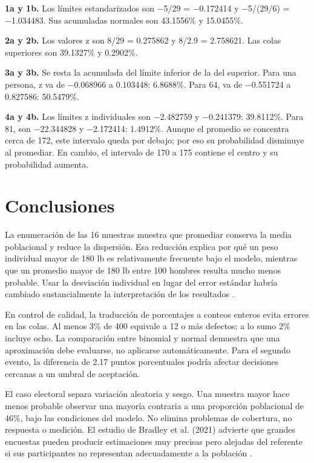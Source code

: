 {\textbf{1a y 1b.} Los límites estandarizados son −5/29 = −0.172414 y −5/(29/6) = −1.034483. Sus acumuladas normales son 43.1556\% y 15.0455\%.

\textbf{2a y 2b.} Los valores z son 8/29 = 0.275862 y 8/2.9 = 2.758621. Las colas superiores son 39.1327\% y 0.2902\%.

\textbf{3a y 3b.} Se resta la acumulada del límite inferior de la del superior. Para una persona, z va de −0.068966 a 0.103448: 6.8688\%. Para 64, va de −0.551724 a 0.827586: 50.5479\%.

\textbf{4a y 4b.} Los límites z individuales son −2.482759 y −0.241379: 39.8112\%. Para 81, son −22.344828 y −2.172414: 1.4912\%. Aunque el promedio se concentra cerca de 172, este intervalo queda por debajo; por eso su probabilidad disminuye al promediar. En cambio, el intervalo de 170 a 175 contiene el centro y su probabilidad aumenta.

\clearpage
\section{Conclusiones}
La enumeración de las 16 muestras muestra que promediar conserva la media poblacional y reduce la dispersión. Esa reducción explica por qué un peso individual mayor de 180 lb es relativamente frecuente bajo el modelo, mientras que un promedio mayor de 180 lb entre 100 hombres resulta mucho menos probable. Usar la desviación individual en lugar del error estándar habría cambiado sustancialmente la interpretación de los resultados \citep{holmesBusiness2023}.

En control de calidad, la traducción de porcentajes a conteos enteros evita errores en las colas. Al menos 3\% de 400 equivale a 12 o más defectos; a lo sumo 2\% incluye ocho. La comparación entre binomial y normal demuestra que una aproximación debe evaluarse, no aplicarse automáticamente. Para el segundo evento, la diferencia de 2.17 puntos porcentuales podría afectar decisiones cercanas a un umbral de aceptación.

El caso electoral separa variación aleatoria y sesgo. Una muestra mayor hace menos probable observar una mayoría contraria a una proporción poblacional de 46\%, bajo las condiciones del modelo. No elimina problemas de cobertura, no respuesta o medición. El estudio de Bradley et al. (2021) advierte que grandes encuestas pueden producir estimaciones muy precisas pero alejadas del referente si sus participantes no representan adecuadamente a la población \citep{bradley2021}.

}

